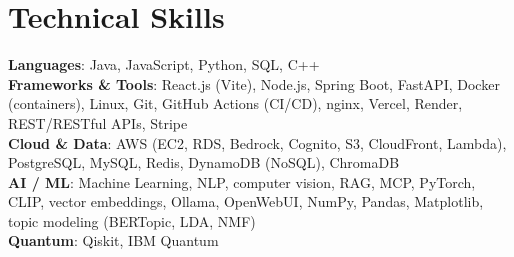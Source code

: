 \documentclass[letterpaper,10pt]{article}
\newcommand{\nk}{\kern0pt}
\begin{document}
\section{Technical Skills}
 \begin{itemize}[leftmargin=0.15in, label={}]
    \small{\item{
     \textbf{Languages}{: Java, JavaScript, Python, SQL, C++} \\
     \textbf{F\nk rameworks \& T\nk ools}{: React.js (Vite), Node.js, Spring Boot, FastAPI, Docker (containers), Linux, Git, GitHub Actions (CI/CD), nginx, Vercel, Render, REST/RESTful APIs, Stripe} \\
     \textbf{Cloud \& Data}{: A\nk WS (EC2, RDS, Bedrock, Cognito, S3, CloudFront, Lambda), PostgreSQL, MySQL, Redis, DynamoDB (NoSQL), ChromaDB} \\
     \textbf{AI / ML}{: Machine Learning, NLP, computer vision, RAG, MCP, PyTorch, CLIP, vector embeddings, Ollama, OpenWebUI, NumPy, Pandas, Matplotlib, topic modeling (BERTopic, LDA, NMF)} \\
     \textbf{Quantum}{: Qiskit, IBM Quantum} \\
    }}
 \end{itemize}

\end{document}
